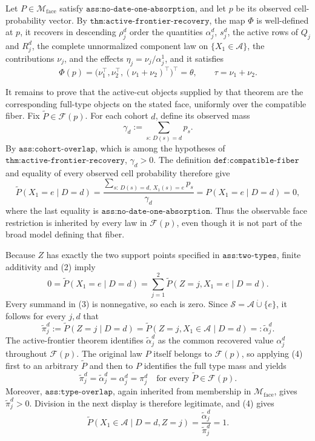 Let \(P\in\mathcal M_{\mathrm{face}}\) satisfy \(\texttt{ass:no-date-one-absorption}\), and let \(p\) be its observed cell-probability vector.  By \(\texttt{thm:active-frontier-recovery}\), the map \(\Phi\) is well-defined at \(p\), it recovers in descending \(\rho_j^d\) order the quantities \(\alpha_j^d\), \(s_j^d\), the active rows of \(Q_j\) and \(R_j^d\), the complete unnormalized component law on \(\{X_1\in\mathcal A\}\), the contributions \(\nu_j\), and the effects \(\eta_j=\nu_j/\alpha_j^1\), and it satisfies
\[
 \Phi(p)=\bigl(\nu_1^\top,\nu_2^\top,(\nu_1+\nu_2)^\top\bigr)^\top
        =\theta,
 \qquad
 \tau=\nu_1+\nu_2.                                      \tag{1}
\]

It remains to prove that the active-cut objects supplied by that theorem are the corresponding full-type objects on the stated face, uniformly over the compatible fiber.  Fix \(\widetilde P\in\mathcal F(p)\).  For each cohort \(d\), define its observed mass
\[
 \gamma_d:=\sum_{s:\,D(s)=d}p_s.
\]
By \(\texttt{ass:cohort-overlap}\), which is among the hypotheses of \(\texttt{thm:active-frontier-recovery}\), \(\gamma_d>0\).  The definition \(\texttt{def:compatible-fiber}\) and equality of every observed cell probability therefore give
\[
 \widetilde P(X_1=e\mid D=d)
 =\frac{\sum_{s:\,D(s)=d,\,X_1(s)=e}p_s}{\gamma_d}
 =P(X_1=e\mid D=d)
 =0,                                                       \tag{2}
\]
where the last equality is \(\texttt{ass:no-date-one-absorption}\).  Thus the observable face restriction is inherited by every law in \(\mathcal F(p)\), even though it is not part of the broad model defining that fiber.

Because \(Z\) has exactly the two support points specified in \(\texttt{ass:two-types}\), finite additivity and (2) imply
\[
 0=\widetilde P(X_1=e\mid D=d)
  =\sum_{j=1}^2\widetilde P(Z=j,X_1=e\mid D=d).             \tag{3}
\]
Every summand in (3) is nonnegative, so each is zero.  Since \(\mathcal S=\mathcal A\mathbin{\dot\cup}\{e\}\), it follows for every \(j,d\) that
\[
 \widetilde\pi_j^d
 :=\widetilde P(Z=j\mid D=d)
 =\widetilde P(Z=j,X_1\in\mathcal A\mid D=d)
 =:\widetilde\alpha_j^d.                                  \tag{4}
\]
The active-frontier theorem identifies \(\widetilde\alpha_j^d\) as the common recovered value \(\alpha_j^d\) throughout \(\mathcal F(p)\).  The original law \(P\) itself belongs to \(\mathcal F(p)\), so applying (4) first to an arbitrary \(\widetilde P\) and then to \(P\) identifies the full type mass and yields
\[
 \widetilde\pi_j^d=\widetilde\alpha_j^d=\alpha_j^d=\pi_j^d
 \quad\text{for every }\widetilde P\in\mathcal F(p).       \tag{5}
\]
Moreover, \(\texttt{ass:type-overlap}\), again inherited from membership in \(\mathcal M_{\mathrm{face}}\), gives \(\widetilde\pi_j^d>0\).  Division in the next display is therefore legitimate, and (4) gives
\[
 \widetilde P(X_1\in\mathcal A\mid D=d,Z=j)
 =\frac{\widetilde\alpha_j^d}{\widetilde\pi_j^d}=1.       \tag{6}
\]

